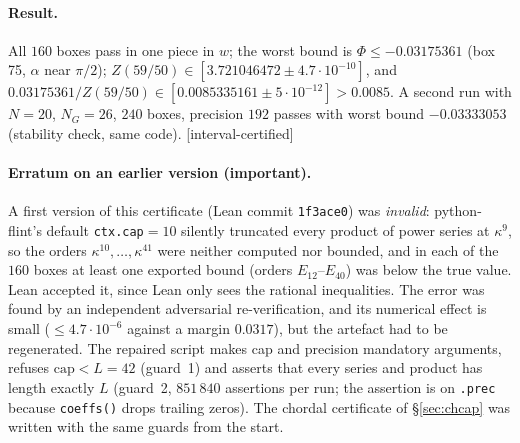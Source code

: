 \documentclass[11pt,a4paper]{article}
\theoremstyle{remark}
\theoremstyle{definition}
\newcommand{\st}[1]{\textsf{[#1]}}
\begin{document}
\paragraph{Result.} All $160$ boxes pass in one piece in $w$; the worst bound is
$\Phi\le-0.03175361$ (box 75, $\alpha$ near $\pi/2$); $Z(59/50)\in[3.721046472\pm4.7\cdot10^{-10}]$, and
$0.03175361/Z(59/50)\in[0.0085335161\pm5\cdot10^{-12}]>0.0085$. A second run with $N=20$, $N_G=26$,
$240$ boxes, precision $192$ passes with worst bound $-0.03333053$ (stability check, same code).
\st{interval-certified}

\paragraph{Erratum on an earlier version (important).} A first version of this certificate (Lean commit
\texttt{1f3ace0}) was \emph{invalid}: python-flint's default \texttt{ctx.cap}${}=10$ silently truncated every
product of power series at $\kappa^9$, so the orders $\kappa^{10},\dots,\kappa^{41}$ were neither computed nor
bounded, and in each of the $160$ boxes at least one exported bound (orders $E_{12}$--$E_{40}$) was below
the true value. Lean accepted it, since Lean only sees the rational inequalities. The error was found by
an independent adversarial re-verification, and its numerical effect is small ($\le4.7\cdot10^{-6}$ against a margin
$0.0317$), but the artefact had to be regenerated. The repaired script makes cap and precision mandatory
arguments, refuses $\mathrm{cap}<L=42$ (guard~1) and asserts that every series and product has length
exactly $L$ (guard~2, $851\,840$ assertions per run; the assertion is on \texttt{.prec} because
\texttt{coeffs()} drops trailing zeros). The chordal certificate of \S\ref{sec:chcap} was written with the
same guards from the start.
\end{document}
